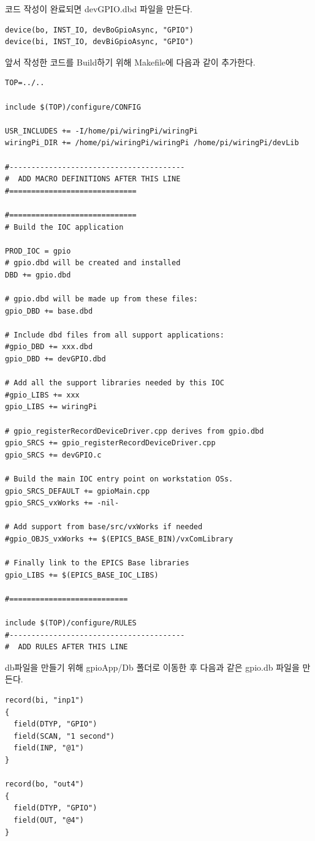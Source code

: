 \documentclass[11pt
  , a4paper
  , article
  , oneside
]{memoir}
\begin{document}
코드 작성이 완료되면 devGPIO.dbd 파일을 만든다.
\begin{lstlisting}[style=termstyle]
device(bo, INST_IO, devBoGpioAsync, "GPIO")
device(bi, INST_IO, devBiGpioAsync, "GPIO")
\end{lstlisting}
앞서 작성한 코드를 Build하기 위해 Makefile에 다음과 같이 추가한다.
\begin{lstlisting}[style=termstyle]
TOP=../..

include $(TOP)/configure/CONFIG

USR_INCLUDES += -I/home/pi/wiringPi/wiringPi
wiringPi_DIR += /home/pi/wiringPi/wiringPi /home/pi/wiringPi/devLib

#----------------------------------------
#  ADD MACRO DEFINITIONS AFTER THIS LINE
#=============================

#=============================
# Build the IOC application

PROD_IOC = gpio
# gpio.dbd will be created and installed
DBD += gpio.dbd

# gpio.dbd will be made up from these files:
gpio_DBD += base.dbd

# Include dbd files from all support applications:
#gpio_DBD += xxx.dbd
gpio_DBD += devGPIO.dbd

# Add all the support libraries needed by this IOC
#gpio_LIBS += xxx
gpio_LIBS += wiringPi

# gpio_registerRecordDeviceDriver.cpp derives from gpio.dbd
gpio_SRCS += gpio_registerRecordDeviceDriver.cpp
gpio_SRCS += devGPIO.c

# Build the main IOC entry point on workstation OSs.
gpio_SRCS_DEFAULT += gpioMain.cpp
gpio_SRCS_vxWorks += -nil-

# Add support from base/src/vxWorks if needed
#gpio_OBJS_vxWorks += $(EPICS_BASE_BIN)/vxComLibrary

# Finally link to the EPICS Base libraries
gpio_LIBS += $(EPICS_BASE_IOC_LIBS)

#===========================

include $(TOP)/configure/RULES
#----------------------------------------
#  ADD RULES AFTER THIS LINE
\end{lstlisting}
db파일을 만들기 위해 gpioApp/Db 폴더로 이동한 후 다음과 같은 gpio.db 파일을 만든다. 
\begin{lstlisting}[style=termstyle]
record(bi, "inp1")
{
  field(DTYP, "GPIO")
  field(SCAN, "1 second")
  field(INP, "@1")
}

record(bo, "out4")
{
  field(DTYP, "GPIO")
  field(OUT, "@4")
}
\end{lstlisting}
\end{document}
